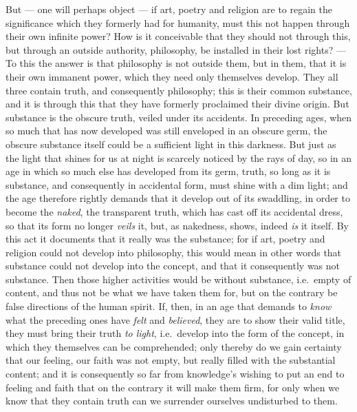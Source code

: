\documentclass[12pt,a4paper,openany]{book}
\newcommand{\opage}[1]{\marginnote{\footnotesize\textit{[#1]}}}
\begin{document}
But --- one will perhaps object --- if art, poetry and religion are to regain the
significance which they formerly had for humanity, must this not happen through their
own infinite power? How is it conceivable that they should not through this, but
through an outside authority, philosophy, be installed in their lost rights? --- To this the answer is
that philosophy is not outside them, but in them, that it is their own immanent
\setcounter{footnote}{0}%
\opage{150}power, which they need only themselves develop. They all three contain truth, and
consequently philosophy; this is their common substance, and it is through this that
they have formerly proclaimed their divine origin. But substance is the obscure
truth, veiled under its accidents. In preceding ages, when so much that has now
developed was still enveloped in an obscure germ, the obscure substance itself could
be a sufficient light in this darkness. But just as the light that shines for us at
night is scarcely noticed by the rays of day, so in an age in which so much else has
developed from its germ, truth, so long as it is substance, and consequently in
accidental form, must shine with a dim light; and the age therefore rightly demands
that it develop out of its swaddling, in order to become the \emph{naked}, the
transparent truth, which has cast off its accidental dress, so that its form no
longer \emph{veils} it, but, as nakedness, shows, indeed \emph{is} it itself. By this
act it documents that it really was the substance; for if art, poetry and religion
could not develop into philosophy, this would mean in other words that substance
could not develop into the concept, and that it consequently was not substance. Then
those higher activities would be without substance, i.e.\ empty of content, and thus
not be what we have taken them for, but on the contrary be false directions of the
human spirit. If, then, in an age that demands to \emph{know} what the preceding ones
have \emph{felt} and \emph{believed}, they are to show their valid title, they must
bring their truth \emph{to light}, i.e.\ develop into the form of the concept, in
which they themselves can be comprehended; only thereby do we gain certainty that our
feeling, our faith was not empty, but really filled with the substantial content; and
it is consequently so far from knowledge's wishing to put an end to feeling and faith
that on the contrary it will make them firm, for only when we know that they contain
truth can we surrender ourselves undisturbed to them.
\end{document}
